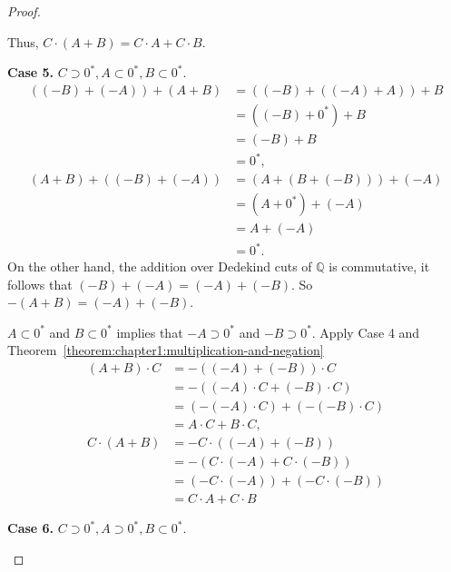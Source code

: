 \begin{proof}
\begin{enumerate}[label={(F\arabic*)}, start=5]
              Thus, $C\cdot (A + B) = C\cdot A + C\cdot B$.

              \textbf{Case 5.} $C\supset {0}^{*}, A\subset {0}^{*}, B\subset {0}^{*}$.
              \begin{align*}
                  ((-B) + (-A)) + (A + B) & = ((-B) + ((-A) + A)) + B \\
                                          & = ((-B) + {0}^{*}) + B    \\
                                          & = (-B) + B                \\
                                          & = {0}^{*},                \\
                  (A + B) + ((-B) + (-A)) & = (A + (B + (-B))) + (-A) \\
                                          & = (A + {0}^{*}) + (-A)    \\
                                          & = A + (-A)                \\
                                          & = {0}^{*}.
              \end{align*}
              On the other hand, the addition over Dedekind cuts of $\mathbb{Q}$ is commutative, it follows that $(-B) + (-A) = (-A) + (-B)$. So $-(A + B) = (-A) + (-B)$.

              $A\subset {0}^{*}$ and $B\subset {0}^{*}$ implies that $-A\supset {0}^{*}$ and $-B\supset {0}^{*}$. Apply Case 4 and Theorem~\ref{theorem:chapter1:multiplication-and-negation}
              \begin{align*}
                  (A + B)\cdot C & = -((-A) + (-B))\cdot C           \\
                                 & = -((-A)\cdot C + (-B)\cdot C)    \\
                                 & = (-(-A)\cdot C) + (-(-B)\cdot C) \\
                                 & = A\cdot C + B\cdot C,            \\
                  C\cdot (A + B) & = -C\cdot ((-A) + (-B))           \\
                                 & = -(C\cdot (-A) + C\cdot (-B))    \\
                                 & = (-C\cdot (-A)) + (-C\cdot (-B)) \\
                                 & = C\cdot A + C\cdot B
              \end{align*}

              \textbf{Case 6.} $C\supset {0}^{*}, A\supset {0}^{*}, B\subset {0}^{*}$.


\end{enumerate}
\end{proof}

